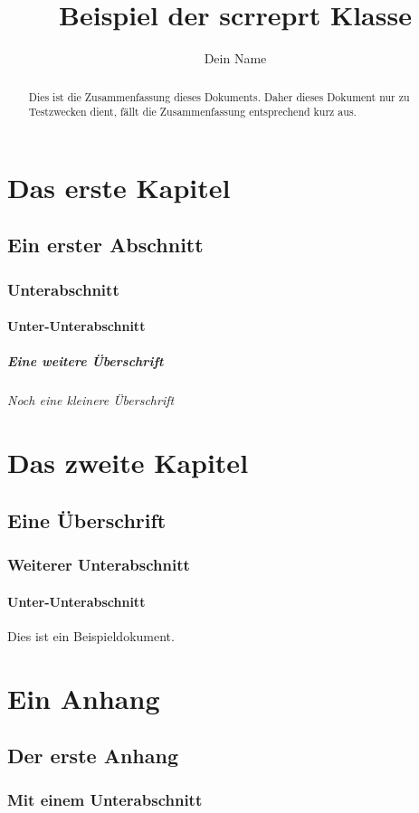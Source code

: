 \documentclass[pdftex,a4paper]{scrreprt}
\title{Beispiel der scrreprt Klasse}
\author{Dein Name}
\begin{document}
\maketitle

\begin{abstract}
Dies ist die Zusammenfassung dieses Dokuments. Daher dieses Dokument nur zu Testzwecken dient, fällt die Zusammenfassung entsprechend kurz aus.
\end{abstract}

\tableofcontents

\chapter{Das erste Kapitel}

\section{Ein erster Abschnitt}

\subsection{Unterabschnitt}

\subsubsection{Unter-Unterabschnitt}

\paragraph{Eine weitere Überschrift}

\subparagraph{Noch eine kleinere Überschrift}

\chapter{Das zweite Kapitel}

\section{Eine Überschrift}

\subsection{Weiterer Unterabschnitt}

\subsubsection{Unter-Unterabschnitt}

Dies ist ein Beispieldokument.

\appendix

\chapter{Ein Anhang}

\section{Der erste Anhang}

\subsection{Mit einem Unterabschnitt}
\end{document}
